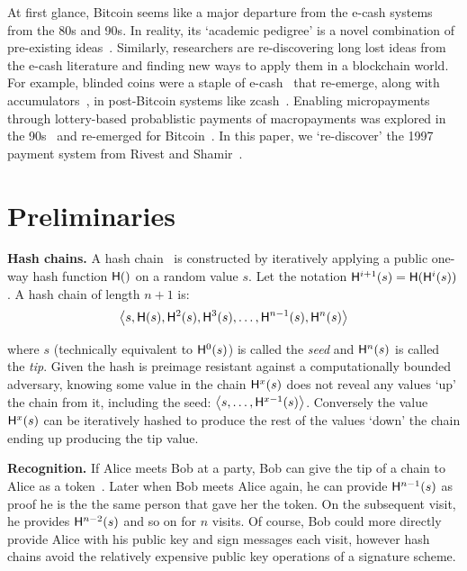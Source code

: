 At first glance, Bitcoin seems like a major departure from the e-cash systems from the 80s and 90s. In reality, its `academic pedigree' is a novel combination of pre-existing ideas~\cite{NaCl17}. Similarly, researchers are re-discovering long lost ideas from the e-cash literature and finding new ways to apply them in a blockchain world. For example, blinded coins were a staple of e-cash~\cite{Cha82} that re-emerge, along with accumulators~\cite{SaTa99}, in post-Bitcoin systems like zcash~\cite{MGGR13,SCG+14}. Enabling micropayments through lottery-based probablistic payments of macropayments was explored in the 90s~\cite{Riv97,Whe97,JaOd97} and re-emerged for Bitcoin~\cite{Pash15}. In this paper, we `re-discover' the 1997 payment system \pw from Rivest and Shamir~\cite{RS96}. 


\section{Preliminaries}

\textbf{Hash chains.} A hash chain~\cite{Lam81} is constructed by iteratively applying a public one-way hash function $\mathsf{H}()$ on a random value $s$. Let the notation $\mathsf{H}^{i+1}(s) = \mathsf{H}(\mathsf{H}^{i}(s))$. A hash chain of length $n+1$ is:
\begin{equation*} \left \langle s,\mathsf{H}(s),\mathsf{H}^{2}(s),\mathsf{H}^{3}(s),\ldots,\mathsf{H}^{n-1}(s),\mathsf{H}^{n}(s) \right \rangle \end{equation*}

where $s$ (technically equivalent to $\mathsf{H}^{0}(s)$) is called the \textit{seed} and $\mathsf{H}^{n}(s)$ is called the \textit{tip}. Given the hash is preimage resistant against a computationally bounded adversary, knowing some value in the chain $\mathsf{H}^{x}(s)$ does not reveal any values `up' the chain from it, including the seed: $\left \langle s,\ldots,\mathsf{H}^{x-1}(s) \right \rangle$. Conversely the value $\mathsf{H}^{x}(s)$ can be iteratively hashed to produce the rest of the values `down' the chain ending up producing the tip value. 

\textbf{Recognition.} If Alice meets Bob at a party, Bob can give the tip of a chain to Alice as a token~\cite{ABC+98}. Later when Bob meets Alice again, he can provide $\mathsf{H}^{n-1}(s)$ as proof he is the the same person that gave her the token. On the subsequent visit, he provides $\mathsf{H}^{n-2}(s)$ and so on for $n$ visits. Of course, Bob could more directly provide Alice with his public key and sign messages each visit, however hash chains avoid the relatively expensive public key operations of a signature scheme.

